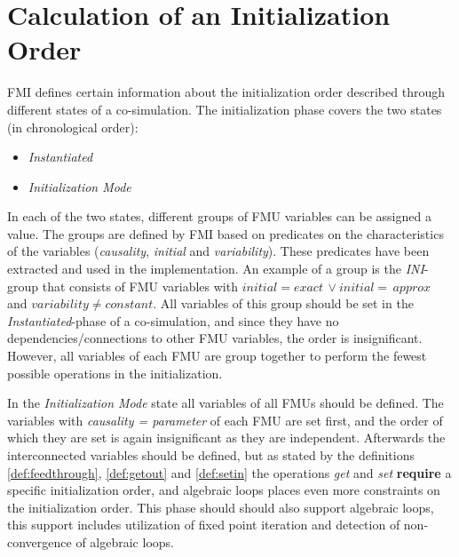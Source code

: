 \section{Calculation of an Initialization Order}\label{sc:initilization}
FMI defines certain information about the initialization order described through different states of a co-simulation. The initialization phase covers the two states (in chronological order):
\begin{itemize}
    \item \textit{Instantiated}
    \item \textit{Initialization Mode}
\end{itemize}
In each of the two states, different groups of FMU variables can be assigned a value. The groups are defined by FMI based on predicates on the characteristics of the variables (\textit{causality}, \textit{initial} and \textit{variability}). These predicates have been extracted and used in the implementation. 
An example of a group is the \textit{INI}-group that consists of FMU variables with $initial = exact\, \lor initial = \,approx $  and $variability \neq constant$. All variables of this group should be set in the \textit{Instantiated}-phase of a co-simulation, and since they have no dependencies/connections to other FMU variables, the order is insignificant. However, all variables of each FMU are group together to perform the fewest possible operations in the initialization. 

In the \textit{Initialization Mode} state all variables of all FMUs should be defined.
The variables with \textit{causality = parameter} of each FMU are set first, and the order of which they are set is again insignificant as they are independent.
Afterwards the interconnected variables should be defined, but as stated by the definitions \ref{def:feedthrough}, \ref{def:getout} and \ref{def:setin} the operations \textit{get} and \textit{set} \textbf{require} a specific initialization order, and algebraic loops places even more constraints on the initialization order. This phase should should also support algebraic loops, this support includes utilization of fixed point iteration and detection of non-convergence of algebraic loops.

